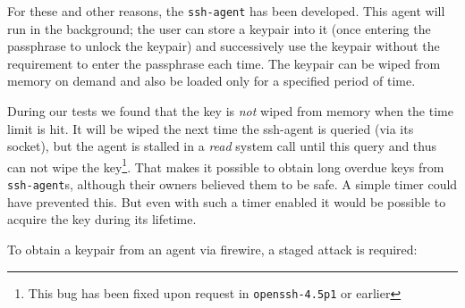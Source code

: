 For these and other reasons, the \texttt{ssh-agent} has been developed. This
agent will run in the background; the user can store a keypair into it (once
entering the passphrase to unlock the keypair) and successively use the keypair
without the requirement to enter the passphrase each time. The keypair can be
wiped from memory on demand and also be loaded only for a specified period of
time.

During our tests we found that the key is \emph{not} wiped from memory when the
time limit is hit. It will be wiped the next time the ssh-agent is queried (via
its socket), but the agent is stalled in a \emph{read} system call until this
query and thus can not wipe the key\footnote{This bug has been fixed upon
request in \texttt{openssh-4.5p1} or earlier}.  That makes it possible to obtain
long overdue keys from \texttt{ssh-agent}s, although their owners believed them
to be safe. A simple timer could have prevented this. But even with such a timer
enabled it would be possible to acquire the key during its lifetime.

To obtain a keypair from an agent via firewire, a staged attack is required:



